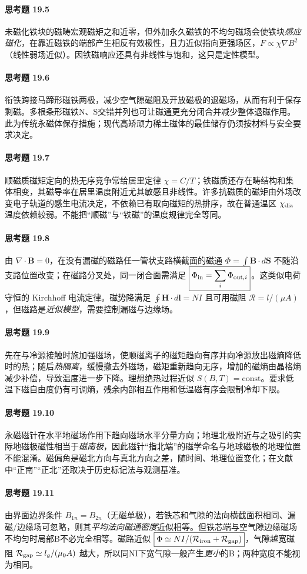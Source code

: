 \paragraph{思考题 19.5}
未磁化铁块的磁畴宏观磁矩之和近零，但外加永久磁铁的不均匀磁场会使铁块\emph{感应磁化}，在靠近磁铁的端部产生相反有效极性，且力近似指向更强场区，\(F\propto\chi\nabla B^2\)（线性弱场近似）。因铁磁响应还具有非线性与饱和，这只是定性模型。

\paragraph{思考题 19.6}
衔铁跨接马蹄形磁铁两极，减少空气隙磁阻及开放磁极的退磁场，从而有利于保存剩磁。多根条形磁铁N、S交错并列也可让磁通更充分闭合并减少整体退磁作用。此为传统永磁体保存措施；现代高矫顽力稀土磁体的最佳储存仍须按材料与安全要求决定。

\paragraph{思考题 19.7}
顺磁质磁矩定向的热无序竞争常给居里定律 \(\chi=C/T\)；铁磁质还存在畴结构和集体相变，其磁导率在居里温度附近尤其敏感且非线性。许多抗磁质的磁矩由外场改变电子轨道的感生电流决定，不依赖已有取向磁矩的热排序，故在普通温区 \(\chi_{\rm dia}\) 温度依赖较弱。不能把“顺磁”与“铁磁”的温度规律完全等同。

\paragraph{思考题 19.8}
由 \(\nabla\cdot\boldsymbol B=0\)，在没有漏磁的磁路任一管状支路横截面的磁通 \(\Phi=\int\boldsymbol B\cdot d\boldsymbol S\) 不随沿支路位置改变；在磁路分叉处，同一闭合面需满足 \(\boxed{\Phi_{\rm in}=\sum_i\Phi_{{\rm out},i}}\)。这类似电荷守恒的 Kirchhoff 电流定律。磁势降满足 \(\oint\boldsymbol H\cdot d\boldsymbol l=NI\) 且可用磁阻 \(\mathcal R=l/(\mu A)\)，但磁路是\emph{近似模型}，需要控制漏磁与边缘场。

\paragraph{思考题 19.9}
先在与冷源接触时施加强磁场，使顺磁离子的磁矩趋向有序并向冷源放出磁熵降低时的热；随后\emph{热隔离}，缓慢撤去外磁场，磁矩重新趋向无序，增加的磁熵由晶格熵减少补偿，导致温度进一步下降。理想绝热过程近似 \(S(B,T)=\mathrm{const}\)。要求低温下磁自由度仍有可调熵，残余内部相互作用和低温磁有序会限制冷却下限。

\paragraph{思考题 19.10}
永磁磁针在水平地磁场作用下趋向磁场水平分量方向；地理北极附近与之吸引的实际地磁极磁性相当于\emph{磁南极}，因此磁针“指北端”的磁学命名与地球磁极的地理位置不能混淆。磁偏角是磁北方向与真北方向之差，随时间、地理位置变化；在文献中“正南”“正北”还取决于历史标记法与观测基准。

\paragraph{思考题 19.11}
由界面边界条件 \(B_{1n}=B_{2n}\)（无磁单极），若铁芯和气隙的法向横截面积相同、漏磁/边缘场可忽略，则其\emph{平均法向磁通密度}近似相等。但铁芯端与空气隙边缘磁场不均匀时局部B不必完全相等。磁路近似 \(\boxed{\Phi\simeq NI/(\mathcal R_{\rm iron}+\mathcal R_{\rm gap})}\)，气隙越宽磁阻 \(\mathcal R_{\rm gap}\simeq l_g/(\mu_0A)\) 越大，所以同NI下宽气隙一般产生\emph{更小}的B；两种宽度不能视为相同。
